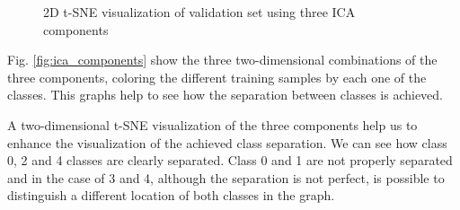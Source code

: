 \documentclass{llncs}
\begin{document}
\begin{figure}
	\centering
	\caption{2D t-SNE visualization of validation set using three ICA components}  
	\label{fig:ica} 
\end{figure}

Fig. \ref{fig:ica_components} show the three two-dimensional combinations of the three components, coloring the different training samples by each one of the classes. This graphs help to see how the separation between classes is achieved. 

A two-dimensional t-SNE visualization \cite{maaten2008visualizing} of the three components help us to enhance the visualization of the achieved class separation. We can see how class 0, 2 and 4 classes are clearly separated. Class 0 and 1 are not properly separated and in the case of 3 and 4, although the separation is not perfect, is possible to distinguish a different location of both classes in the graph.
\end{document}
